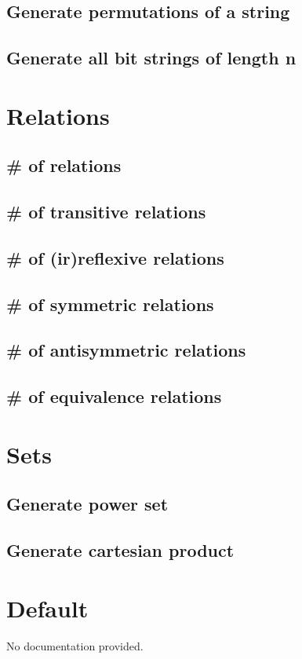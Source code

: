 \documentclass{article}
\begin{document}
\subsection{Generate permutations of a string}
\subsection{Generate all bit strings of length n}

\section{Relations}
\subsection{\# of relations}
\subsection{\# of transitive relations}
\subsection{\# of (ir)reflexive relations}
\subsection{\# of symmetric relations}
\subsection{\# of antisymmetric relations}
\subsection{\# of equivalence relations}

\section{Sets}
\subsection{Generate power set}
\subsection{Generate cartesian product}

\section{Default}
No documentation provided.
\end{document}
